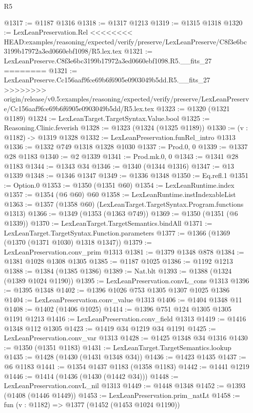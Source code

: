\begin{lexlean}{R5}
\begin{coremodule}
{{{{{{{{{{{{{{{{{{{{{{{{{{{{{{{{{{{{{{{{{{{{{{{{{{{{{{{{{{{{{{{{{{{{{{{{{{{{{{{{{{{{@1317 := @1187 @1316
@1318 := @1317 @1213
@1319 := @1315 @1318
@1320 := LexLeanPreservation.Rel
<<<<<<<< HEAD:examples/reasoning/expected/verify/preserve/LexLeanPreserve/C8f3e6bc3199b17972a3ed0660ebf1098/R5.lex.tex
@1321 := LexLeanPreserve.C8f3e6bc3199b17972a3ed0660ebf1098.R5.__fits_27
========
@1321 := LexLeanPreserve.Cc156aaf9fce69b6f6905e0903049b5dd.R5.__fits_27
>>>>>>>> origin/release/v0.5:examples/reasoning/expected/verify/preserve/LexLeanPreserve/Cc156aaf9fce69b6f6905e0903049b5dd/R5.lex.tex
@1323 := @1320 (@1321 @1189)
@1324 := LexLeanTarget.TargetSyntax.Value.bool
@1325 := Reasoning.Clinic.feverish
@1328 := @1323 (@1324 (@1325 @1189))
@1330 := (v : @1182) -> @1319 @1328
@1332 := LexLeanPreservation.funRel_intro @1313
@1336 := @1332 @749 @1318 @1328 @1030
@1337 := Prod.{0, 0}
@1339 := @1337 @28 @1183
@1340 := @2 @1339
@1341 := Prod.mk.{0, 0}
@1343 := @1341 @28 @1183
@1344 := @1343 @34
@1346 := @1340 (@1344 @1316)
@1347 := @13 @1339
@1348 := @1346 @1347
@1349 := @1336 @1348
@1350 := Eq.refl.{1}
@1351 := Option.{0}
@1353 := @1350 (@1351 @60)
@1354 := LexLeanRuntime.index
@1357 := @1354 (@6 @60) @60
@1358 := LexLeanRuntime.instIndexableList
@1363 := @1357 (@1358 @60) (LexLeanTarget.TargetSyntax.Program.functions @1313)
@1366 := @1349 (@1353 (@1363 @749))
@1369 := @1350 (@1351 (@6 @1339))
@1370 := LexLeanTarget.TargetSemantics.bindAll
@1371 := LexLeanTarget.TargetSyntax.Function.parameters
@1377 := @1366 (@1369 (@1370 (@1371 @1030) @1318 @1347))
@1379 := LexLeanPreservation.conv_prim @1313
@1381 := @1379 @1348 @878
@1384 := @1381 @1028 @1308 @1305
@1385 := @1187 @1025
@1386 := @1192 @1213
@1388 := @1384 (@1385 @1386)
@1389 := Nat.blt
@1393 := @1388 (@1324 (@1389 @1024 @1190))
@1395 := LexLeanPreservation.convL_cons @1313
@1396 := @1395 @1348
@1402 := @1396 @1026 @753 @1305 @1307 @1025 @1386
@1404 := LexLeanPreservation.conv_value @1313
@1406 := @1404 @1348 @11
@1408 := @1402 (@1406 @1025)
@1414 := @1396 @751 @124 @1305 @1305 @1191 @1213
@1416 := LexLeanPreservation.conv_field @1313
@1419 := @1416 @1348 @112 @1305
@1423 := @1419 @34 @1219 @34 @1191
@1425 := LexLeanPreservation.conv_var @1313
@1428 := @1425 @1348 @34 @1316
@1430 := @1350 (@1351 @1183)
@1431 := LexLeanTarget.TargetSemantics.lookup
@1435 := @1428 (@1430 (@1431 @1348 @34))
@1436 := @1423 @1435
@1437 := @6 @1183
@1441 := @1354 @1437 @1183 (@1358 @1183)
@1442 := @1441 @1219
@1446 := @1414 (@1436 (@1430 (@1442 @34)))
@1448 := LexLeanPreservation.convL_nil @1313
@1449 := @1448 @1348
@1452 := @1393 (@1408 (@1446 @1449))
@1453 := LexLeanPreservation.prim_natLt
@1458 := fun (v : @1182) => @1377 (@1452 (@1453 @1024 @1190))
}}}}}}}}}}}}}}}}}}}}}}}}}}}}}}}}}}}}}}}}}}}}}}}}}}}}}}}}}}}}}}}}}}}}}}}}}}}}}}}}}}}}
\end{coremodule}
\end{lexlean}
